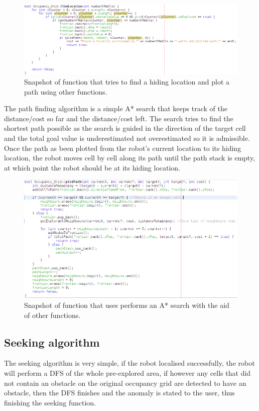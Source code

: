 \documentclass[a4paper,12pt]{article}
\begin{document}
\begin{figure}[H]
\includegraphics[scale=0.55]{Find_Location_SS.png}
\caption{Snapshot of function that tries to find a hiding location and plot a path using other functions.}
\end{figure}

\vspace{5mm}
\noindent The path finding algorithm is a simple A* search that keeps track of the distance/cost so far and the distance/cost left. The search tries to find the shortest path possible as the search is guided in the direction of the target cell and the total goal value is underestimated not overestimated so it is admissible. Once the path as been plotted from the robot's current location to its hiding location, the robot moves cell by cell along its path until the path stack is empty, at which point the robot should be at its hiding location.

\begin{figure}[H]
\includegraphics[scale=0.6]{Plot_Path_SS.png}
\caption{Snapshot of function that uses performs an A* search with the aid of other functions.}
\end{figure}

\subsection{Seeking algorithm}
\noindent The seeking algorithm is very simple, if the robot localised successfully, the robot will perform a DFS of the whole pre-explored area, if however any cells that did not contain an obstacle on the original occupancy grid are detected to have an obstacle, then the DFS finishes and the anomaly is stated to the user, thus finishing the seeking function.
\end{document}
